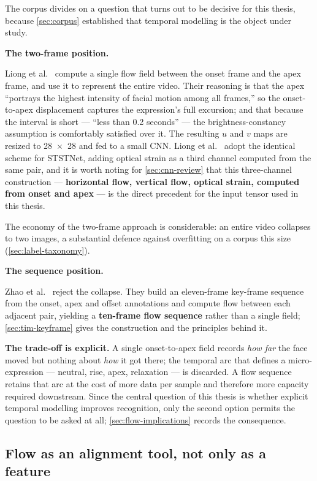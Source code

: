 The corpus divides on a question that turns out to be decisive for this thesis, because \autoref{sec:corpus} established that temporal modelling is the object under study.

\textbf{The two-frame position.}

Liong et al.~\cite{liong2019a} compute a single flow field between the onset frame and the apex frame, and use it to represent the entire video. Their reasoning is that the apex ``portrays the highest intensity of facial motion among all frames,'' so the onset-to-apex displacement captures the expression's full excursion; and that because the interval is short --- ``less than 0.2 seconds'' --- the brightness-constancy assumption is comfortably satisfied over it. The resulting $u$ and $v$ maps are resized to 28~$\times$~28 and fed to a small CNN. Liong et al.~\cite{liong2019b} adopt the identical scheme for STSTNet, adding optical strain as a third channel computed from the same pair, and it is worth noting for \autoref{sec:cnn-review} that this three-channel construction --- \textbf{horizontal flow, vertical flow, optical strain, computed from onset and apex} --- is the direct precedent for the input tensor used in this thesis.

The economy of the two-frame approach is considerable: an entire video collapses to two images, a substantial defence against overfitting on a corpus this size (\autoref{sec:label-taxonomy}).

\textbf{The sequence position.}

Zhao et al.~\cite{zhaoS2021} reject the collapse. They build an eleven-frame key-frame sequence from the onset, apex and offset annotations and compute flow between each adjacent pair, yielding a \textbf{ten-frame flow sequence} rather than a single field; \autoref{sec:tim-keyframe} gives the construction and the principles behind it.

\textbf{The trade-off is explicit.} A single onset-to-apex field records \textit{how far} the face moved but nothing about \textit{how} it got there; the temporal arc that defines a micro-expression --- neutral, rise, apex, relaxation --- is discarded. A flow sequence retains that arc at the cost of more data per sample and therefore more capacity required downstream. Since the central question of this thesis is whether explicit temporal modelling improves recognition, only the second option permits the question to be asked at all; \autoref{sec:flow-implications} records the consequence.

\subsection{Flow as an alignment tool, not only as a feature}
\label{sec:flow-alignment}

